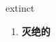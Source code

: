 
\begin{frame}
{\huge extinct}
\begin{center}
\begin{enumerate}\Large
  \item \textbf{灭绝的}
\end{enumerate}
\end{center}
\end{frame}
